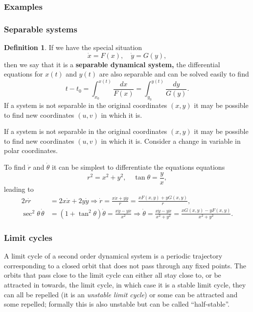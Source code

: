 \documentclass[12pt, a4paper]{article}
\newcommand{\f}[2]{\frac{#1}{#2}}
\newcommand{\imply}{\Rightarrow}
\theoremstyle{definition}
\newtheorem{definition}{Definition}[section]
\theoremstyle{plain}
\begin{document}
\subsubsection*{Examples}



\subsubsection{Separable systems}

\begin{definition}
If we have the special situation $$\dot{x}=F(x), \quad \dot{y}=G(y),$$ then we say that it is a \textbf{separable dynamical system,} the differential equations for $x(t)$ and $y(t)$ are also separable and can be solved easily to find $$t-t_0=\int_{x_0}^{x(t)} \f{dx}{F(x)}=\int_{y_0}^{y(t)} \f{dy}{G(y)}.$$ If a system is not separable in the original coordinates $(x,y)$ it may be possible to find new coordinates $(u,v)$ in which it is.
\end{definition}

If a system is not separable in the original coordinates $(x,y)$ it may be possible to find new coordinates $(u,v)$ in which it is. Consider a change in variable in polar coordinates. 

To find $\dot{r}$ and $\dot{\theta}$ it can be simplest to differentiate the equations equations $$r^2=x^2+y^2, \quad \tan\theta=\f{y}{x},$$ leading to $$\begin{aligned}
2r\dot{r}&=2x\dot{x}+2y\dot{y} \imply \dot{r}=\f{x\dot{x}+y\dot{y}}{r}=\f{xF(x,y)+yG(x,y)}{r}, \\
\sec^2\theta \, \dot{\theta} &=(1+\tan^2\theta)\dot{\theta}=\f{x\dot{y}-y\dot{x}}{x^2} \imply \dot{\theta}=\f{x\dot{y}-y\dot{x}}{x^2+y^2}=\f{xG(x,y)-yF(x,y)}{x^2+y^2}.
\end{aligned}$$

\subsubsection{Limit cycles}

A limit cycle of a second order dynamical system is a periodic trajectory corresponding to a closed orbit that does not pass through any fixed points. The orbits that pass close to the limit cycle can either all stay close to, or be attracted in towards, the limit cycle, in which case it is a stable limit cycle, they can all be repelled (it is an \textit{unstable limit cycle}) or some can be attracted and some repelled; formally this is also unstable but can be called “half-stable”.
\end{document}
